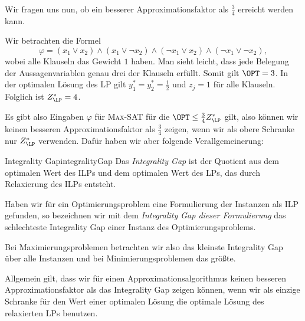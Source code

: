 \documentclass[language=ngerman,algolist]{TemplateLecture}
\begin{document}
Wir fragen uns nun, ob ein besserer Approximationsfaktor als $\frac{3}{4}$ erreicht werden kann.

\begin{expl}
    Wir betrachten die Formel 
    \begin{equation*}
        \varphi = (x_1 \vee x_2) \wedge (x_1 \vee \neg x_2) \wedge (\neg x_1 \vee x_2) \wedge (\neg x_1 \vee \neg x_2),
    \end{equation*}
    wobei alle Klauseln das Gewicht $1$ haben. Man sieht leicht, dass jede Belegung der Aussagenvariablen genau drei der Klauseln erfüllt. Somit gilt $\OPT = 3$. In der optimalen Lösung des LP gilt $y_1^* = y_2^* = \frac{1}{2}$ und $z_j = 1$ für alle Klauseln. Folglich ist $Z^*_{\LP} = 4$.
\end{expl}

Es gibt also Eingaben $\varphi$ für \textsc{Max-SAT} für die $\OPT \leq \frac{3}{4}Z^*_{\LP}$ gilt, also können wir keinen besseren Approximationsfaktor als $\frac{3}{4}$ zeigen, wenn wir als obere Schranke nur $Z^*_{\LP}$ verwenden. Dafür haben wir aber folgende Verallgemeinerung:

\begin{defi}{Integrality Gap}{integralityGap}
    Das \emph{Integrality Gap} ist der Quotient aus dem optimalen Wert des ILPs und dem optimalen Wert des LPs, das durch Relaxierung des ILPs entsteht.

    Haben wir für ein Optimierungsproblem eine Formulierung der Instanzen als ILP gefunden, so bezeichnen wir mit dem \emph{Integrality Gap dieser Formulierung} das schlechteste Integrality Gap einer Instanz des Optimierungsproblems.
\end{defi}
Bei Maximierungsproblemen betrachten wir also das kleinste Integrality Gap über alle Instanzen und bei Minimierungsproblemen das größte.

Allgemein gilt, dass wir für einen Approximationsalgorithmus keinen besseren Approximationsfaktor als das Integrality Gap zeigen können, wenn wir als einzige Schranke für den Wert einer optimalen Lösung die optimale Lösung des relaxierten LPs benutzen.

\end{document}
